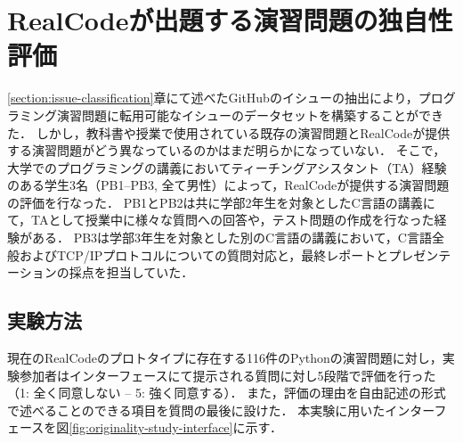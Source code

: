 \chapter{RealCodeが出題する演習問題の独自性評価}
\graphicspath{{Chapters_evaluation/Figs/}}
\label{section:ta_evaluation}


\ref{section:issue-classification}章にて述べたGitHubのイシューの抽出により，プログラミング演習問題に転用可能なイシューのデータセットを構築することができた．
しかし，教科書や授業で使用されている既存の演習問題とRealCodeが提供する演習問題がどう異なっているのかはまだ明らかになっていない．
そこで，大学でのプログラミングの講義においてティーチングアシスタント（TA）経験のある学生3名（PB1--PB3, 全て男性）によって，RealCodeが提供する演習問題の評価を行なった．
PB1とPB2は共に学部2年生を対象としたC言語の講義にて，TAとして授業中に様々な質問への回答や，テスト問題の作成を行なった経験がある．
PB3は学部3年生を対象とした別のC言語の講義において，C言語全般およびTCP/IPプロトコルについての質問対応と，最終レポートとプレゼンテーションの採点を担当していた．


\section{実験方法}
現在のRealCodeのプロトタイプに存在する116件のPythonの演習問題に対し，実験参加者はインターフェースにて提示される質問に対し5段階で評価を行った（1: 全く同意しない -- 5: 強く同意する）．
また，評価の理由を自由記述の形式で述べることのできる項目を質問の最後に設けた．
本実験に用いたインターフェースを図\ref{fig:originality-study-interface}に示す．

